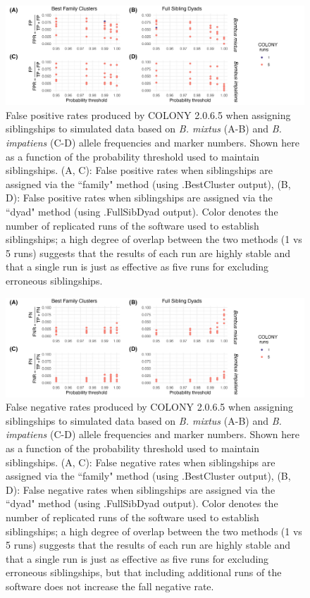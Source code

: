 \documentclass[12pt]{article}
\begin{document}
\begin{figure}[H]
    \centering
    \includegraphics[width=\linewidth]{appendix_figures/fpr_repetition.jpg}
    \caption{False positive rates produced by COLONY 2.0.6.5 when assigning siblingships to simulated data based on \emph{B. mixtus} (A-B) and \emph{B. impatiens} (C-D) allele frequencies and marker numbers. Shown here as a function of the probability threshold used to maintain siblingships. (A, C): False positive rates when siblingships are assigned via the ``family" method (using .BestCluster output), (B, D): False positive rates when siblingships are assigned via the ``dyad" method (using .FullSibDyad output). Color denotes the number of replicated runs of the software used to establish siblingships; a high degree of overlap between the two methods (1 vs 5 runs) suggests that the results of each run are highly stable and that a single run is just as effective as five runs for excluding erroneous siblingships.}
    \label{fig:fpr_repetition}
\end{figure}

\begin{figure}[H]
    \centering
    \includegraphics[width=\linewidth]{appendix_figures/fnr_repetition.jpg}
    \caption{False negative rates produced by COLONY 2.0.6.5 when assigning siblingships to simulated data based on \emph{B. mixtus} (A-B) and \emph{B. impatiens} (C-D) allele frequencies and marker numbers. Shown here as a function of the probability threshold used to maintain siblingships. (A, C): False negative rates when siblingships are assigned via the ``family" method (using .BestCluster output), (B, D): False negative rates when siblingships are assigned via the ``dyad" method (using .FullSibDyad output). Color denotes the number of replicated runs of the software used to establish siblingships; a high degree of overlap between the two methods (1 vs 5 runs) suggests that the results of each run are highly stable and that a single run is just as effective as five runs for excluding erroneous siblingships, but that including additional runs of the software does not increase the fall negative rate.}
    \label{fig:fnr_repetition}
\end{figure}
\end{document}

